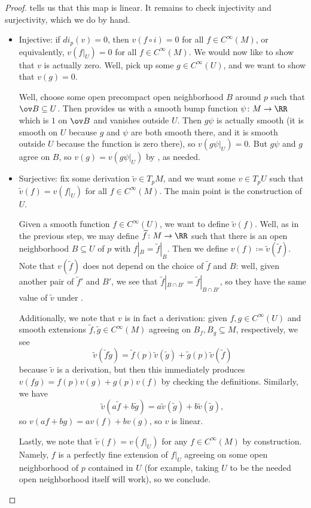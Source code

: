 \documentclass[../notes.tex]{subfiles}
\begin{document}
\begin{proof}
	 tells us that this map is linear. It remains to check injectivity and surjectivity, which we do by hand.
	\begin{itemize}
		\item Injective: if $di_p(v)=0$, then $v(f\circ i)=0$ for all $f\in C^\infty(M)$, or equivalently, $v(f|_U)=0$ for all $f\in C^\infty(M)$. We would now like to show that $v$ is actually zero. Well, pick up some $g\in C^\infty(U)$, and we want to show that $v(g)=0$. 

		Well, choose some open precompact open neighborhood $B$ around $p$ such that $\ov B\subseteq U$. Then  provides us with a smooth bump function $\psi\colon M\to\RR$ which is $1$ on $\ov B$ and vanishes outside $U$. Then $g\psi$ is actually smooth (it is smooth on $U$ because $g$ and $\psi$ are both smooth there, and it is smooth outside $U$ because the function is zero there), so $v(g\psi|_U)=0$. But $g\psi$ and $g$ agree on $B$, so $v(g)=v(g\psi|_U)$ by , as needed.

		\item Surjective: fix some derivation $\widetilde v\in T_pM$, and we want some $v\in T_pU$ such that $\widetilde v(f)=v(f|_U)$ for all $f\in C^\infty(M)$. The main point is the construction of $U$.
		
		Given a smooth function $f\in C^\infty(U)$, we want to define $\widetilde v(f)$. Well, as in the previous step, we may define $\widetilde f\colon M\to\RR$ such that there is an open neighborhood $B\subseteq U$ of $p$ with $f|_B=\widetilde f|_B$. Then we define $v(f)\coloneqq\widetilde v(\widetilde f)$. Note that $v(\widetilde f)$ does not depend on the choice of $\widetilde f$ and $B$: well, given another pair of $\widetilde f'$ and $B'$, we see that $\widetilde f|_{B\cap B'}=\widetilde f|_{B\cap B'}$, so they have the same value of $\widetilde v$ under .

		Additionally, we note that $v$ is in fact a derivation: given $f,g\in C^\infty(U)$ and smooth extensions $\widetilde f,\widetilde g\in C^\infty(M)$ agreeing on $B_f,B_g\subseteq M$, respectively, we see
		\[\widetilde v(\widetilde f\widetilde g)=\widetilde f(p)\widetilde v(\widetilde g)+\widetilde g(p)\widetilde v(\widetilde f)\]
		because $\widetilde v$ is a derivation, but then this immediately produces $v(fg)=f(p)v(g)+g(p)v(f)$ by checking the definitions. Similarly, we have
		\[\widetilde v(a\widetilde f+b\widetilde g)=a\widetilde v(\widetilde g)+b\widetilde v(\widetilde g),\]
		so $v(af+bg)=av(f)+bv(g)$, so $v$ is linear.

		Lastly, we note that $\widetilde v(f)=v(f|_U)$ for any $f\in C^\infty(M)$ by construction. Namely, $f$ is a perfectly fine extension of $f|_U$ agreeing on some open neighborhood of $p$ contained in $U$ (for example, taking $U$ to be the needed open neighborhood itself will work), so we conclude.
		\qedhere
	\end{itemize}
\end{proof}
\end{document}
